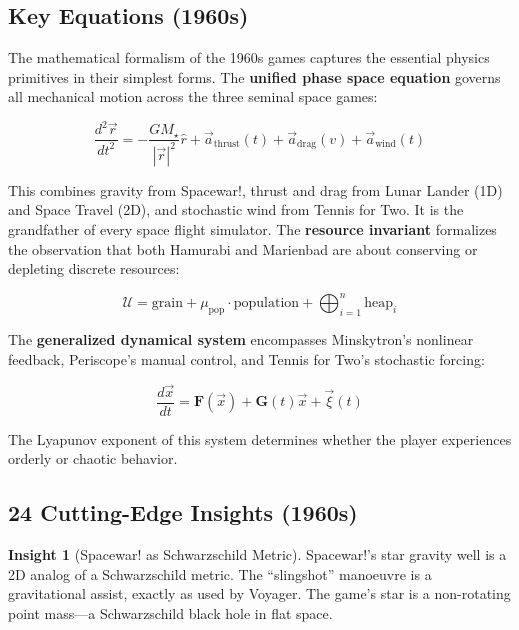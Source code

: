 \documentclass[11pt,a4paper]{article}
\theoremstyle{definition}
\newtheorem{insight}{Insight}[section]
\begin{document}
\subsection{Key Equations (1960s)}

The mathematical formalism of the 1960s games captures the essential physics primitives in their simplest forms. The \textbf{unified phase space equation} governs all mechanical motion across the three seminal space games:

\begin{equation}\label{eq:1960s-unified}
\boxed{\frac{d^2\vec{r}}{dt^2} = -\frac{GM_{\star}}{|\vec{r}|^2}\hat{r} + \vec{a}_{\text{thrust}}(t) + \vec{a}_{\text{drag}}(v) + \vec{a}_{\text{wind}}(t)}
\end{equation}

This combines gravity from Spacewar!, thrust and drag from Lunar Lander (1D) and Space Travel (2D), and stochastic wind from Tennis for Two. It is the grandfather of every space flight simulator. The \textbf{resource invariant} formalizes the observation that both Hamurabi and Marienbad are about conserving or depleting discrete resources:

\begin{equation}\label{eq:1960s-resource}
\boxed{\mathcal{U} = \text{grain} + \mu_{\text{pop}}\cdot\text{population} + \bigoplus_{i=1}^{n}\text{heap}_i}
\end{equation}

The \textbf{generalized dynamical system} encompasses Minskytron's nonlinear feedback, Periscope's manual control, and Tennis for Two's stochastic forcing:

\begin{equation}\label{eq:1960s-dynamical}
\boxed{\frac{d\vec{x}}{dt} = \mathbf{F}(\vec{x}) + \mathbf{G}(t)\vec{x} + \vec{\xi}(t)}
\end{equation}

The Lyapunov exponent of this system determines whether the player experiences orderly or chaotic behavior.

\subsection{24 Cutting-Edge Insights (1960s)}

\begin{insight}[Spacewar! as Schwarzschild Metric]
Spacewar!'s star gravity well is a 2D analog of a Schwarzschild metric. The ``slingshot'' manoeuvre is a gravitational assist, exactly as used by Voyager. The game's star is a non-rotating point mass---a Schwarzschild black hole in flat space.
\end{insight}
\end{document}
